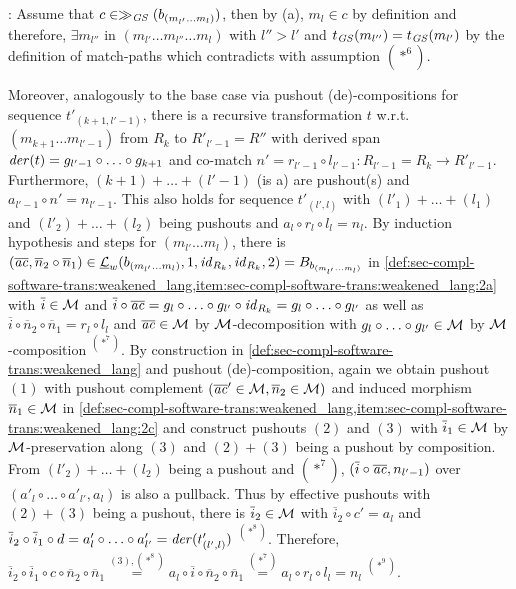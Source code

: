 \begin{enumerate}
\begin{enumerate*}
\item: Assume that $c \in \gg_\mathit{GS}(b_{(m_{l'}\ldots m_l)})$, then by (a), $m_l \in c$ by definition and therefore, $\exists m_{l''}$ in $(m_{l'}\ldots m_{l''}\ldots m_l)$ with $l'' > l'$ and $t_\mathit{GS}(m_{l''})=t_\mathit{GS}(m_{l'})$ by the definition of match-paths which contradicts with assumption $(*^6)$.
\end{enumerate*}
Moreover, analogously to the base case via pushout (de)-compositions for sequence $t'_{(k+1,l'-1)}$, there is a recursive transformation $t$ w.r.t. $(m_{k+1}\ldots m_{l'-1})$ from $R_k$ to $R'_{l'-1}=R''$ with derived span $\mathit{der}(t)=g_{l'-1} \circ \ldots \circ g_{k+1}$ and co-match $n'=r_{l'-1} \circ l_{l'-1}\colon R_{l'-1}=R_k \to R'_{l'-1}$.
Furthermore, $(k+1)+\ldots +(l'-1)$ (is a) are pushout(s) and $a_{l'-1} \circ n'=n_{l'-1}$.
This also holds for sequence $t'_{(l',l)}$ with $(l'_1)+\ldots +(l_1)$ and $(l'_2)+\ldots +(l_2)$ being pushouts and $a_l \circ r_l \circ l_l=n_l$.
By induction hypothesis and steps for $(m_{l'}\ldots m_l)$, there is $(\overline{\mathit{ac}},\overline{n}_2 \circ \overline{n}_1) \in \underline{\mathcal{L}}_w(b_{(m_{l'}\ldots m_l)}, 1,\mathit{id}_{R_k},\mathit{id}_{R_k},2)=B_{b_{(m_{l'}\ldots m_l)}}$ in \cref{def:sec-compl-software-trans:weakened_lang,item:sec-compl-software-trans:weakened_lang:2a} with $\overline{i} \in {\cal M}$ and $\overline{i} \circ \overline{\mathit{ac}}=g_l\circ \ldots \circ g_{l'} \circ \mathit{id}_{R_k}=g_l\circ \ldots \circ g_{l'}$ as well as $\overline{i} \circ \overline{n}_2 \circ \overline{n}_1=r_{l} \circ l_{l}$ and $\overline{\mathit{ac}} \in {\cal M}$ by ${\cal M}$-decomposition with $g_l\circ \ldots \circ g_{l'} \in {\cal M}$ by ${\cal M}$-composition $^{(*^7)}$.
By construction in \cref{def:sec-compl-software-trans:weakened_lang} and pushout (de)-composition, again we obtain pushout $(1)$ with pushout complement $(\overline{\mathit{ac}}' \in {\cal M},\overline{n}_2 \in {\cal M})$ and induced morphism $\overline{n}_1 \in {\cal M}$ in \cref{def:sec-compl-software-trans:weakened_lang,item:sec-compl-software-trans:weakened_lang:2c} and construct pushouts $(2)$ and $(3)$ with $\overline{i}_1 \in {\cal M}$ by ${\cal M}$-preservation along $(3)$ and $(2)+(3)$ being a pushout by composition.
From $(l'_2)+\ldots +(l_2)$ being a pushout and $(*^7)$, $(\overline{i}\circ \overline{\mathit{ac}},n_{l'-1})$ over $(a'_l \circ \ldots \circ a'_{l'},a_l)$ is also a pullback.
Thus by effective pushouts with $(2)+(3)$ being a pushout, there is $\overline{i}_2 \in {\cal M}$ with $\overline{i}_2 \circ c'=a_l$ and $\overline{i}_2 \circ \overline{i}_1 \circ d=a'_l \circ \ldots \circ a'_{l'}=\mathit{der}(t'_{(l',l)})$ $^{(*^8)}$.
Therefore, $\overline{i}_2 \circ \overline{i}_1 \circ c \circ \overline{n}_2 \circ \overline{n}_1 \stackrel{(3),(*^8)}{=} a_l \circ \overline{i} \circ \overline{n}_2 \circ \overline{n}_1 \stackrel{(*^7)}{=} a_l \circ r_l \circ l_l=n_l$ $^{(*^9)}$.

\end{enumerate}
